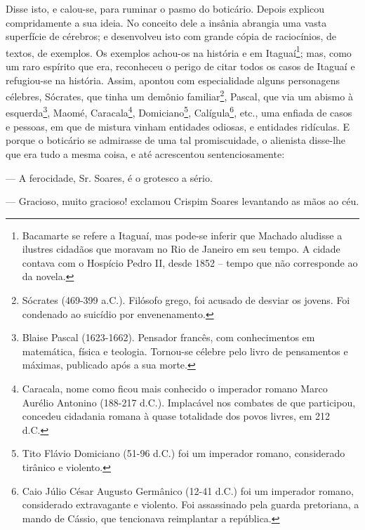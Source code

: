 Disse isto, e calou-se, para ruminar o pasmo do boticário. Depois
explicou compridamente a sua ideia. No conceito dele a insânia abrangia
uma vasta superfície de cérebros; e desenvolveu isto com grande cópia de
raciocínios, de textos, de exemplos. Os exemplos achou-os na história e
em Itaguaí\footnote{Bacamarte se refere a Itaguaí, mas pode-se inferir
  que Machado aludisse a ilustres cidadãos que moravam no Rio de Janeiro
  em seu tempo. A cidade contava com o Hospício Pedro II, desde 1852 --
  tempo que não corresponde ao da novela.}; mas, como um raro espírito
que era, reconheceu o perigo de citar todos os casos de Itaguaí e
refugiou-se na história. Assim, apontou com especialidade alguns
personagens célebres, Sócrates, que tinha um demônio familiar\footnote{Sócrates
  (469-399 a.C.). Filósofo grego, foi acusado de desviar os jovens. Foi
  condenado ao suicídio por envenenamento.}, Pascal, que via um abismo à
esquerda\footnote{Blaise Pascal (1623-1662). Pensador francês, com
  conhecimentos em matemática, física e teologia. Tornou-se célebre pelo
  livro de pensamentos e máximas, publicado após a sua morte.}, Maomé,
Caracala\footnote{Caracala, nome como ficou mais conhecido o imperador
  romano Marco Aurélio Antonino (188-217 d.C.). Implacável nos combates
  de que participou, concedeu cidadania romana à quase totalidade dos
  povos livres, em 212 d.C.}, Domiciano\footnote{Tito Flávio Domiciano
  (51-96 d.C.) foi um imperador romano, considerado tirânico e violento.},
Calígula\footnote{Caio Júlio César Augusto Germânico (12-41 d.C.) foi um
  imperador romano, considerado extravagante e violento. Foi assassinado
  pela guarda pretoriana, a mando de Cássio, que tencionava reimplantar
  a república.}, etc., uma enfiada de casos e pessoas, em que de mistura
vinham entidades odiosas, e entidades ridículas. E porque o boticário se
admirasse de uma tal promiscuidade, o alienista disse-lhe que era tudo a
mesma coisa, e até acrescentou sentenciosamente:

--- A ferocidade, Sr. Soares, é o grotesco a sério.

--- Gracioso, muito gracioso! exclamou Crispim Soares levantando as mãos
ao céu.

